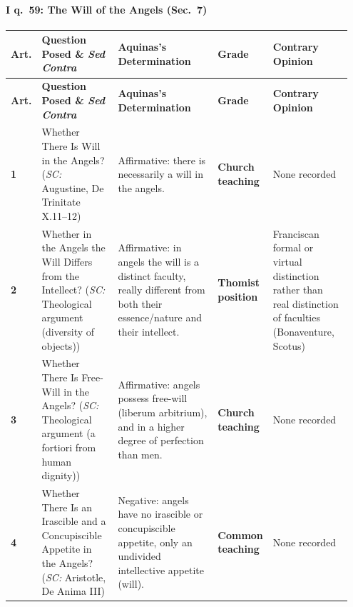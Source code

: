 \paragraph{I q.~59: The Will of the Angels (Sec.~7)}
{\scriptsize
\setlength{\tabcolsep}{2.5pt}
\renewcommand{\arraystretch}{1.15}
\begin{longtable}{>{\raggedright\arraybackslash}p{0.05\linewidth}>{\raggedright\arraybackslash}p{0.23\linewidth}>{\raggedright\arraybackslash}p{0.31\linewidth}>{\raggedright\arraybackslash}p{0.12\linewidth}>{\raggedright\arraybackslash}p{0.24\linewidth}}
\toprule
\textbf{Art.} & \textbf{Question Posed \& \emph{Sed Contra}} & \textbf{Aquinas's Determination} & \textbf{Grade} & \textbf{Contrary Opinion} \\
\midrule
\endfirsthead
\toprule
\textbf{Art.} & \textbf{Question Posed \& \emph{Sed Contra}} & \textbf{Aquinas's Determination} & \textbf{Grade} & \textbf{Contrary Opinion} \\
\midrule
\endhead
\bottomrule
\endfoot
\textbf{1} & Whether There Is Will in the Angels? (\emph{SC:} Augustine, De Trinitate X.11--12) & Affirmative: there is necessarily a will in the angels. & \textbf{Church teaching} & None recorded \\
\addlinespace[1.5pt]
\textbf{2} & Whether in the Angels the Will Differs from the Intellect? (\emph{SC:} Theological argument (diversity of objects)) & Affirmative: in angels the will is a distinct faculty, really different from both their essence/nature and their intellect. & \textbf{Thomist position} & Franciscan formal or virtual distinction rather than real distinction of faculties (Bonaventure, Scotus) \\
\addlinespace[1.5pt]
\textbf{3} & Whether There Is Free-Will in the Angels? (\emph{SC:} Theological argument (a fortiori from human dignity)) & Affirmative: angels possess free-will (liberum arbitrium), and in a higher degree of perfection than men. & \textbf{Church teaching} & None recorded \\
\addlinespace[1.5pt]
\textbf{4} & Whether There Is an Irascible and a Concupiscible Appetite in the Angels? (\emph{SC:} Aristotle, De Anima III) & Negative: angels have no irascible or concupiscible appetite, only an undivided intellective appetite (will). & \textbf{Common teaching} & None recorded \\
\end{longtable}
}

